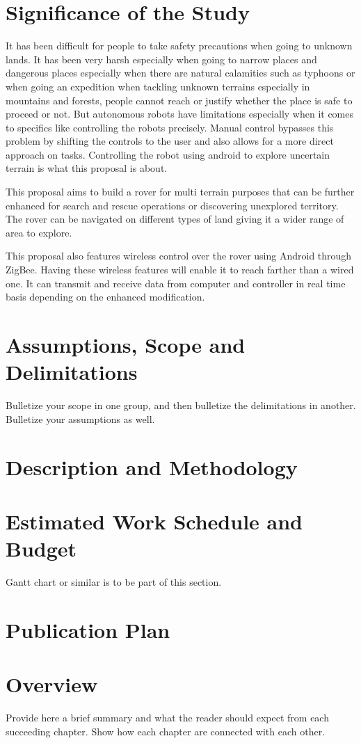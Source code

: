 \section{Significance of the Study}
	It has been difficult for people to take safety precautions when going to unknown lands. It has been very harsh especially when going to narrow places and dangerous places especially when there are natural calamities such as typhoons or when going an expedition when tackling unknown terrains especially in mountains and forests, people cannot reach or justify whether the place is safe to proceed or not. But autonomous robots have limitations especially when it comes to specifics like controlling the robots precisely. Manual control bypasses this problem by shifting the controls to the user and also allows for a more direct approach on tasks. Controlling the robot using android to explore uncertain terrain is what this proposal is about.

	 This proposal aims to build a rover for multi terrain purposes that can be further enhanced for search and rescue operations or discovering unexplored territory. The rover can be navigated on different types of land giving it a wider range of area to explore.

	This proposal also features wireless control over the rover using Android through ZigBee. Having these wireless features will enable it to reach farther than a wired one. It can transmit and receive data from computer and controller in real time basis depending on the enhanced modification.






\section{Assumptions, Scope and Delimitations}

Bulletize your scope in one group, and then bulletize the delimitations in another.  Bulletize your assumptions as well.


\section{Description and Methodology}

\blindtext


\ifFinished
\else

\section{Estimated Work Schedule and Budget}

Gantt chart or similar is to be part of this section.

\blindtext

\section{Publication Plan}
\blindtext

\fi


\section{Overview}

Provide here a brief summary and what the reader should expect from each succeeding chapter.  Show how each chapter are connected with each other.


